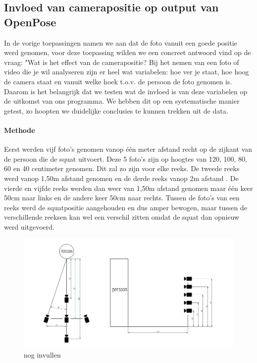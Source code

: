 \documentclass[a4paper,twoside,kulak]{kulakreport}
\begin{document}
\subsection{Invloed van camerapositie op output van OpenPose}
In de vorige toepassingen namen we aan dat de foto vanuit een goede positie werd genomen, voor deze toepassing wilden we een concreet antwoord vind op de vraag: "Wat is het effect van de camerapositie? Bij het nemen van een foto of video die je wil analyseren zijn er heel wat variabelen: hoe ver je staat, hoe hoog de camera staat en vanuit welke hoek t.o.v. de persoon de foto genomen is. Daarom is het belangrijk dat we testen wat de invloed is van deze variabelen op de uitkomst van ons programma. We hebben dit op een systematische manier getest, zo hoopten we duidelijke conclusies te kunnen trekken uit de data.
\label{camerapositie}
\paragraph{Methode}
Eerst werden vijf foto’s genomen vanop één meter afstand recht op de zijkant van de persoon die de squat uitvoert. Deze 5 foto’s zijn op hoogtes van 120, 100, 80, 60 en 40 centimeter genomen. Dit zal zo zijn voor elke reeks. De tweede reeks werd vanop 1,50m afstand genomen en de derde reeks vanop 2m afstand . De vierde en vijfde reeks werden dan weer van 1,50m afstand genomen maar één keer 50cm naar links en de andere keer 50cm naar rechts. Tussen de foto’s van een reeks werd de squatpositie aangehouden en dus amper bewogen, maar tussen de verschillende reeksen kan wel een verschil zitten omdat de squat dan opnieuw werd uitgevoerd.
\begin{figure}
	\includegraphics[width=\textwidth]{cameraopstelling}
	\caption{nog invullen}
\end{figure}
\end{document}
